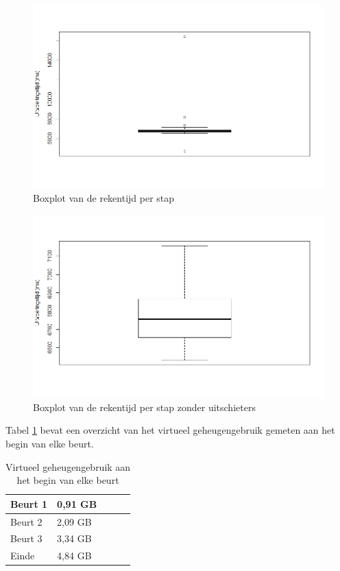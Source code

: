 \begin{figure}
	\includegraphics[width=1.05\textwidth]{chap-evaluatie/boxplot.png}
	\caption{Boxplot van de rekentijd per stap}
	\label{fig:ms}
\end{figure}

\begin{figure}
	\includegraphics[width=1.05\textwidth]{chap-evaluatie/boxplotnooutliers.png}
	\caption{Boxplot van de rekentijd per stap zonder uitschieters}
	\label{fig:ms-nooutliers}
\end{figure}

Tabel \ref{tab:sim-mem} bevat een overzicht van het virtueel geheugengebruik gemeten aan het begin van elke beurt.


\begin{table}[]
	\centering
	\begin{tabular}{|l|l|l|l|l|}
		\hline
		Beurt 1 & 0,91 GB  \\ \hline
		Beurt 2 & 2,09 GB  \\ \hline
		Beurt 3 & 3,34 GB  \\ \hline
		Einde   & 4,84 GB  \\ \hline
	\end{tabular}
	\caption{Virtueel geheugengebruik aan het begin van elke beurt}
	\label{tab:sim-mem}
\end{table}

